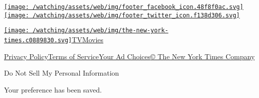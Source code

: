 \href{https://www.facebook.com/nytwatching/}{\texttt{[image: /watching/assets/web/img/footer\_facebook\_icon.48f8f0ac.svg]}}\href{https://twitter.com/watching}{\texttt{[image: /watching/assets/web/img/footer\_twitter\_icon.f138d306.svg]}}

\href{//www.nytimes.com}{\texttt{[image: /watching/assets/web/img/the-new-york-times.c0889830.svg]}}\href{//www.nytimes.com/section/arts/television}{TV}\href{//www.nytimes.com/section/movies}{Movies}

\href{//www.nytimes.com/content/help/rights/privacy/policy/privacy-policy.html}{Privacy
Policy}\href{//www.nytimes.com/content/help/rights/terms/terms-of-service.html}{Terms
of
Service}\href{//www.nytimes.com/content/help/rights/privacy/policy/privacy-policy.html\#pp}{Your
Ad Choices}\href{http://www.nytco.com/}{© The New York Times Company}

Do Not Sell My Personal Information

Your preference has been saved.
